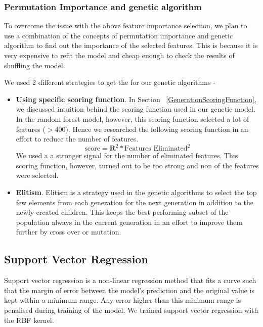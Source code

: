 \documentclass[11pt]{article}
\begin{document}
\subsubsection{Permutation Importance and genetic algorithm}
To overcome the issue with the above feature importance selection, we plan to use a combination of the concepts of permutation importance and genetic algorithm to find out the importance of the selected features.
This is because it is very expensive to refit the model and cheap enough to check the results of shuffling the model.

We used 2 different strategies to get the for our genetic algorithms -
\begin{itemize}
\item \textbf{Using specific scoring function}.  In Section ~\ref{GenerationScoringFunction},  we discussed intuition behind the scoring function used in our genetic model.
In the random forest model,  however,  this scoring function selected a lot of features ($> 400$). Hence we researched the following scoring function in an effort to reduce the number of features. 
$$
\textrm{score} = \mathbf{R}^2 * \textrm{Features Eliminated}^2
$$
We used a a stronger signal for the number of eliminated features. This scoring function, however,  turned out to be too strong and non of the features were selected.
\item \textbf{Elitism}.  Elitism is a strategy used in the genetic algorithms to select the top few elements from each generation for the next generation in addition to the newly created children. This keeps the best performing subset of the population always in the current generation in an effort to improve them further by cross over or mutation.
\end{itemize}


\subsection{Support Vector Regression}
Support vector regression is a non-linear regression method that fits a curve such that the margin of error between the model's prediction and the original value is kept within a minimum range.
Any error higher than this minimum range is penalised during training of the model.
We trained support vector regression with the RBF kernel.
\end{document}
